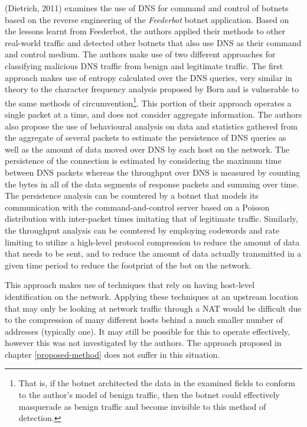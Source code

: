 \documentclass[12pt]{report}
\theoremstyle{remark}
\theoremstyle{definition}
\theoremstyle{definition}
\theoremstyle{definition}
\begin{document}
(Dietrich, 2011)\cite{Dietrich2011} examines the use of DNS for command and
control of botnets based on the reverse engineering of the \emph{Feederbot}
botnet application. Based on the lessons learnt from Feederbot, the authors
applied their methods to other real-world traffic and detected other botnets
that also use DNS as their command and control medium. The authors make use of
two different approaches for classifying malicious DNS traffic from benign and
legitimate traffic. The first approach makes use of entropy calculated over the
DNS queries, very similar in theory to the character frequency analysis proposed
by Born\cite{Born2010.cfa} and is vulnerable to the same methods of
circumvention\footnote{That is, if the botnet architected the data in the
examined fields to conform to the author's model of benign traffic, then the
botnet could effectively masquerade as benign traffic and become invisible to
this method of detection.}. This portion of their approach operates a single
packet at a time, and does not consider aggregate information. The authors also
propose the use of behavioural analysis on data and statistics gathered from the
aggregate of several packets to estimate the persistence of DNS queries as well
as the amount of data moved over DNS by each host on the network. The
persistence of the connection is estimated by considering the maximum time
between DNS packets whereas the throughput over DNS is measured by counting the
bytes in all of the data segments of response packets and summing over time. The
persistence analysis can be countered by a botnet that models its communication
with the command-and-control server based on a Poisson distribution with
inter-packet times imitating that of legitimate traffic. Similarly, the
throughput analysis can be countered by employing codewords and rate limiting to
utilize a high-level protocol compression to reduce the amount of data that
needs to be sent, and to reduce the amount of data actually transmitted in a
given time period to reduce the footprint of the bot on the network.

This approach makes use of techniques that rely on having host-level
identification on the network. Applying these techniques at an upstream location
that may only be looking at network traffic through a NAT would be difficult due
to the compression of many different hosts behind a much smaller number of
addresses (typically one). It may still be possible for this to operate
effectively, however this was not investigated by the authors. The approach
proposed in chapter \ref{proposed-method} does not suffer in this situation.
\end{document}
